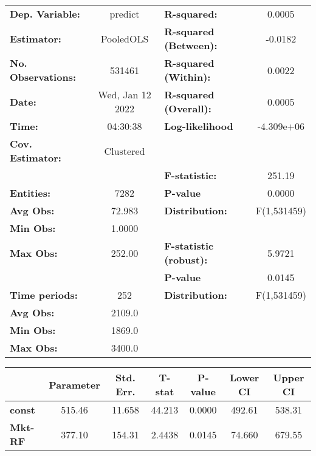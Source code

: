 \begin{center}
\begin{tabular}{lclc}
\toprule
\textbf{Dep. Variable:}    &      predict       & \textbf{  R-squared:         }   &      0.0005      \\
\textbf{Estimator:}        &     PooledOLS      & \textbf{  R-squared (Between):}  &     -0.0182      \\
\textbf{No. Observations:} &       531461       & \textbf{  R-squared (Within):}   &      0.0022      \\
\textbf{Date:}             &  Wed, Jan 12 2022  & \textbf{  R-squared (Overall):}  &      0.0005      \\
\textbf{Time:}             &      04:30:38      & \textbf{  Log-likelihood     }   &    -4.309e+06    \\
\textbf{Cov. Estimator:}   &     Clustered      & \textbf{                     }   &                  \\
\textbf{}                  &                    & \textbf{  F-statistic:       }   &      251.19      \\
\textbf{Entities:}         &        7282        & \textbf{  P-value            }   &      0.0000      \\
\textbf{Avg Obs:}          &       72.983       & \textbf{  Distribution:      }   &   F(1,531459)    \\
\textbf{Min Obs:}          &       1.0000       & \textbf{                     }   &                  \\
\textbf{Max Obs:}          &       252.00       & \textbf{  F-statistic (robust):} &      5.9721      \\
\textbf{}                  &                    & \textbf{  P-value            }   &      0.0145      \\
\textbf{Time periods:}     &        252         & \textbf{  Distribution:      }   &   F(1,531459)    \\
\textbf{Avg Obs:}          &       2109.0       & \textbf{                     }   &                  \\
\textbf{Min Obs:}          &       1869.0       & \textbf{                     }   &                  \\
\textbf{Max Obs:}          &       3400.0       & \textbf{                     }   &                  \\
\bottomrule
\end{tabular}
\begin{tabular}{lcccccc}
                & \textbf{Parameter} & \textbf{Std. Err.} & \textbf{T-stat} & \textbf{P-value} & \textbf{Lower CI} & \textbf{Upper CI}  \\
\midrule
\textbf{const}  &       515.46       &       11.658       &      44.213     &      0.0000      &       492.61      &       538.31       \\
\textbf{Mkt-RF} &       377.10       &       154.31       &      2.4438     &      0.0145      &       74.660      &       679.55       \\
\bottomrule
\end{tabular}
\end{center}
